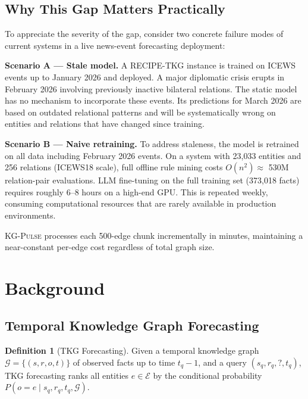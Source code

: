 \documentclass[10pt,a4paper,twocolumn]{article}
\theoremstyle{definition}
\newtheorem{definition}{Definition}[section]
\newcommand{\ourmodel}{\textsc{KG-Pulse}}
\newcommand{\basemodel}{RECIPE-TKG}
\newcommand{\calG}{\mathcal{G}}
\newcommand{\calE}{\mathcal{E}}
\begin{document}
\subsection{Why This Gap Matters Practically}

To appreciate the severity of the gap, consider two concrete failure modes
of current systems in a live news-event forecasting deployment:

\textbf{Scenario A — Stale model.}
A \basemodel{} instance is trained on ICEWS events up to
January 2026 and deployed.
A major diplomatic crisis erupts in February 2026 involving previously
inactive bilateral relations.
The static model has no mechanism to incorporate these events.
Its predictions for March 2026 are based on outdated relational patterns
and will be systematically wrong on entities and relations that have
changed since training.

\textbf{Scenario B — Naive retraining.}
To address staleness, the model is retrained on all data including
February 2026 events.
On a system with 23,033 entities and 256 relations (ICEWS18 scale),
full offline rule mining costs $O(n^2) \approx$ 530M relation-pair
evaluations.
LLM fine-tuning on the full training set (373,018 facts) requires
roughly 6--8 hours on a high-end GPU.
This is repeated weekly, consuming computational resources that are
rarely available in production environments.

\ourmodel{} processes each 500-edge chunk incrementally in minutes,
maintaining a near-constant per-edge cost regardless of total graph size.

\section{Background}
\label{sec:background}

\subsection{Temporal Knowledge Graph Forecasting}

\begin{definition}[TKG Forecasting]
Given a temporal knowledge graph $\calG = \{(s, r, o, t)\}$ of observed
facts up to time $t_q - 1$, and a query $(s_q, r_q, ?, t_q)$, TKG
forecasting ranks all entities $e \in \calE$ by the conditional probability
$P(o = e \mid s_q, r_q, t_q, \calG)$.
\end{definition}
\end{document}
